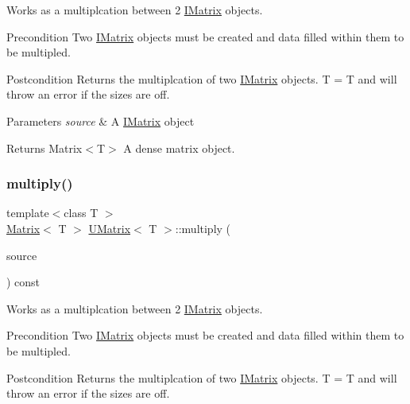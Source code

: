 Works as a multiplcation between 2 \mbox{\hyperlink{class_i_matrix}{I\+Matrix}} objects. 

\begin{DoxyPrecond}{Precondition}
Two \mbox{\hyperlink{class_i_matrix}{I\+Matrix}} objects must be created and data filled within them to be multipled. 
\end{DoxyPrecond}
\begin{DoxyPostcond}{Postcondition}
Returns the multiplcation of two \mbox{\hyperlink{class_i_matrix}{I\+Matrix}} objects. T = T and will throw an error if the sizes are off.
\end{DoxyPostcond}

\begin{DoxyParams}{Parameters}
{\em source} & A \mbox{\hyperlink{class_i_matrix}{I\+Matrix}} object \\
\hline
\end{DoxyParams}
\begin{DoxyReturn}{Returns}
Matrix$<$\+T$>$ A dense matrix object. 
\end{DoxyReturn}
\mbox{\label{class_u_matrix_a55729b6ed8ac7ce6c2ac7baa21c1ea26}} 
\subsubsection{\texorpdfstring{multiply()}{multiply()}\hspace{0.1cm}{\footnotesize\ttfamily [4/6]}}
{\footnotesize\ttfamily template$<$class T $>$ \\
\mbox{\hyperlink{class_matrix}{Matrix}}$<$ T $>$ \mbox{\hyperlink{class_u_matrix}{U\+Matrix}}$<$ T $>$\+::multiply (\begin{DoxyParamCaption}\item[{const \mbox{\hyperlink{class_i_matrix}{I\+Matrix}}$<$ \mbox{\hyperlink{class_u_matrix}{U\+Matrix}}$<$ T $>$, T $>$ \&}]{source }\end{DoxyParamCaption}) const\hspace{0.3cm}{\ttfamily [virtual]}}



Works as a multiplcation between 2 \mbox{\hyperlink{class_i_matrix}{I\+Matrix}} objects. 

\begin{DoxyPrecond}{Precondition}
Two \mbox{\hyperlink{class_i_matrix}{I\+Matrix}} objects must be created and data filled within them to be multipled. 
\end{DoxyPrecond}
\begin{DoxyPostcond}{Postcondition}
Returns the multiplcation of two \mbox{\hyperlink{class_i_matrix}{I\+Matrix}} objects. T = T and will throw an error if the sizes are off.
\end{DoxyPostcond}

